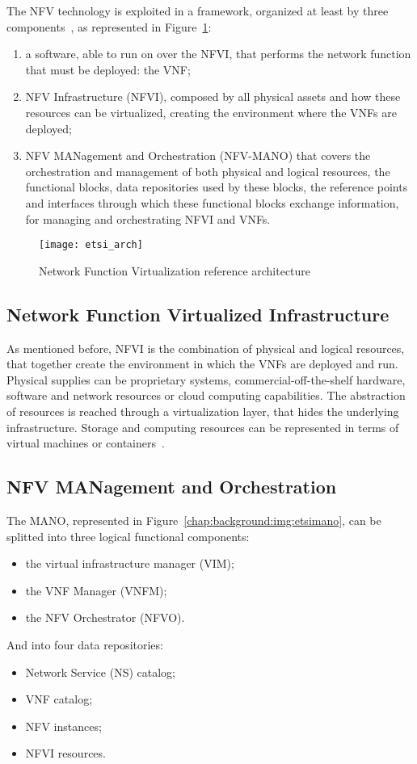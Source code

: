 The NFV technology is exploited in a framework, organized
at least by three components~\cite{etsi2013gs}, as represented in
Figure~\ref{chap:background:img:etsi_arch}:
\begin{enumerate}
  \item a software, able to run on over the NFVI, that performs the network
  function that must be deployed: the VNF;
  \item NFV Infrastructure (NFVI), composed by all physical assets
  and how these resources can be virtualized, creating the environment where the
  VNFs
  are deployed;
  \item NFV MANagement and Orchestration (NFV-MANO) that covers the
  orchestration and management of both physical and logical resources, the
  functional blocks, data repositories used by these blocks, the reference
  points and interfaces through which these functional blocks exchange
  information, for managing and orchestrating NFVI and VNFs.
\end{enumerate}

\begin{figure}
  \centering
  \texttt{[image: etsi\_arch]}
  \caption[Network Function Virtualization reference architecture]{Network
    Function Virtualization reference architecture~\cite{etsi2013gs}}
  \label{chap:background:img:etsi_arch}
\end{figure}

\subsection{Network Function Virtualized Infrastructure}
As mentioned before, NFVI is the combination of physical and logical resources,
that together create the environment in which the VNFs are deployed
and run. Physical supplies can be proprietary systems, commercial-off-the-shelf
hardware, software and network resources or cloud computing capabilities. The
abstraction of resources is reached through a virtualization layer,
that hides the underlying infrastructure. Storage and computing resources can
be represented in terms of virtual machines or
containers~\cite{mijumbi2016network}.

\subsection{NFV MANagement and Orchestration}
The MANO, represented in Figure~\ref{chap:background:img:etsimano}, can be
splitted into three logical functional components:
\begin{itemize}
  \item the virtual infrastructure manager (VIM);
  \item the VNF Manager (VNFM);
  \item the NFV Orchestrator (NFVO).
\end{itemize}
And into four data repositories:
\begin{itemize}
  \item Network Service (NS) catalog;
  \item VNF catalog;
  \item NFV instances;
  \item NFVI resources.
\end{itemize}

